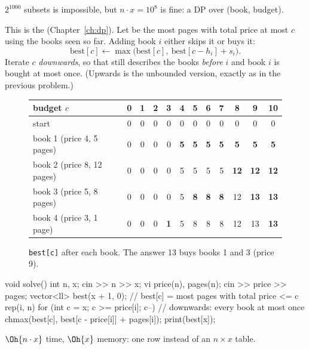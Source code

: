  $2^{1000}$ subsets is impossible, but $n\cdot x = 10^8$ is fine: a DP over (book, budget).

 This is the  (Chapter~\ref{ch:dp}). Let  be the most pages with total
price at most $c$ using the books seen so far. Adding book $i$ either skips it or buys it:
\[
  \mathrm{best}[c] \leftarrow \max\bigl(\mathrm{best}[c],\ \mathrm{best}[c - h_i] + s_i\bigr).
\]
Iterate $c$ \emph{downwards}, so that  still describes the books \emph{before} $i$ and book $i$ is bought
at most once. (Upwards is the unbounded version, exactly as in the previous problem.)

\begin{figure}[H]
\centering
\newcommand{\chg}[1]{\cellcolor{cporange!18}\textbf{#1}}
\small
\setlength{\tabcolsep}{4.2pt}
\begin{tabular}{l*{11}{c}}
\toprule
budget $c$ & 0 & 1 & 2 & 3 & 4 & 5 & 6 & 7 & 8 & 9 & 10 \\
\midrule
start & 0 & 0 & 0 & 0 & 0 & 0 & 0 & 0 & 0 & 0 & 0 \\
book 1 (price 4, 5 pages) & 0 & 0 & 0 & 0 & \chg{5} & \chg{5} & \chg{5} & \chg{5} & \chg{5} & \chg{5} & \chg{5} \\
book 2 (price 8, 12 pages) & 0 & 0 & 0 & 0 & 5 & 5 & 5 & 5 & \chg{12} & \chg{12} & \chg{12} \\
book 3 (price 5, 8 pages) & 0 & 0 & 0 & 0 & 5 & \chg{8} & \chg{8} & \chg{8} & 12 & \chg{13} & \chg{13} \\
book 4 (price 3, 1 page) & 0 & 0 & 0 & \chg{1} & 5 & 8 & 8 & 8 & 12 & 13 & \cellcolor{cpgreen!25}\textbf{13} \\
\bottomrule
\end{tabular}
\caption{\texttt{best[c]} after each book. The answer 13 buys books 1 and 3 (price 9).}
\end{figure}

\begin{code}
void solve() {
    int n, x;
    cin >> n >> x;
    vi price(n), pages(n);
    cin >> price >> pages;
    vector<ll> best(x + 1, 0);  // best[c] = most pages with total price <= c
    rep(i, n)
        for (int c = x; c >= price[i]; c--)  // downwards: every book at most once
            chmax(best[c], best[c - price[i]] + pages[i]);
    print(best[x]);
}
\end{code}

 $\Oh{n\cdot x}$ time, $\Oh{x}$ memory: one row instead of an $n \times x$ table.


